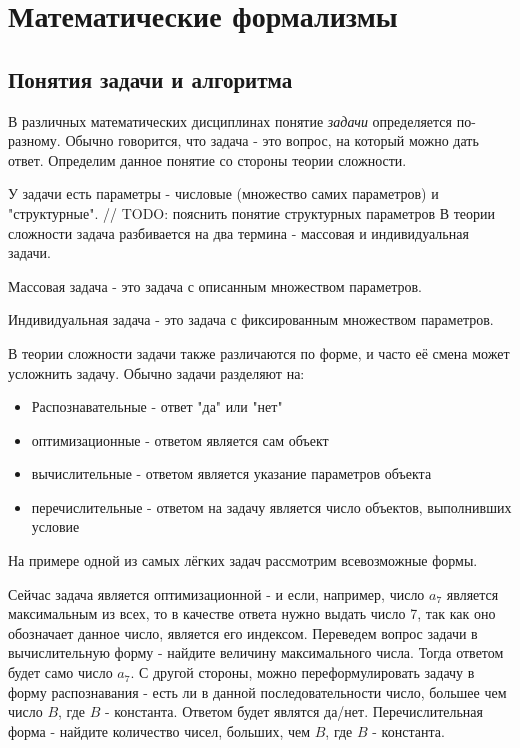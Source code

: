\chapter{Математические формализмы}
\section{Понятия задачи и алгоритма}

В различных математических дисциплинах понятие \textit{задачи} определяется по-разному.
Обычно говорится, что задача - это вопрос, на который можно дать ответ. Определим
данное понятие со стороны теории сложности.

У задачи есть параметры - числовые (множество самих параметров) и "структурные". // TODO: пояснить понятие структурных параметров
В теории сложности задача разбивается на два термина - массовая и индивидуальная задачи.

\begin{definition}
  Массовая задача - это задача с описанным множеством параметров.
\end{definition}

\begin{definition}
  Индивидуальная задача - это задача с фиксированным множеством параметров.
\end{definition}

В теории сложности задачи также различаются по форме, и часто её смена может усложнить задачу.
Обычно задачи разделяют на:
\begin{itemize}
  \item Распознавательные - ответ "да" или "нет"
  \item оптимизационные - ответом является сам объект
  \item вычислительные - ответом является указание параметров объекта
  \item перечислительные - ответом на задачу является число объектов, выполнивших условие
\end{itemize}

На примере одной из самых лёгких задач рассмотрим всевозможные формы.

\begin{abstract}
  Поиск максимального числа
  Заданы N целых чисел: $a_1$, ..., $a_N$. Найдите максимальное из них.
\end{abstract}
Сейчас задача является оптимизационной - и если, например, число $a_7$ является максимальным из всех,
то в качестве ответа нужно выдать число 7, так как оно обозначает данное число, является его индексом.
Переведем вопрос задачи в вычислительную форму - найдите величину максимального числа. Тогда ответом будет само число $a_7$.
С другой стороны, можно переформулировать задачу в форму распознавания - есть ли в данной последовательности
число, большее чем число $B$, где $B$ - константа. Ответом будет являтся да/нет. Перечислительная форма -
найдите количество чисел, больших, чем $B$, где $B$ - константа.

